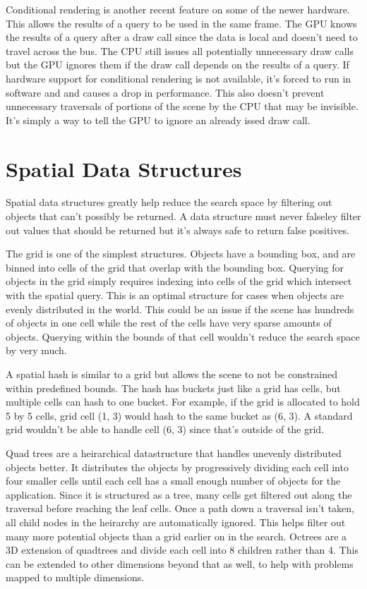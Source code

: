 \documentclass[12pt]{ucthesis}
\begin{document}
Conditional rendering is another recent feature on some of the newer hardware.
This allows the results of a query to be used in the same frame.
The GPU knows the results of a query after a draw call since the data is local and doesn't need to travel across the bus.
The CPU still issues all potentially unnecessary draw calls but the GPU ignores them if the draw call depends on the results of a query.
If hardware support for conditional rendering is not available, it's forced to run in software and and causes a drop in performance.
This also doesn't prevent unnecessary traversals of portions of the scene by the CPU that may be invisible.
It's simply a way to tell the GPU to ignore an already issed draw call.

\section{Spatial Data Structures}
\label{spatial-data-structures}

Spatial data structures greatly help reduce the search space by filtering out objects that can't possibly be returned.
A data structure must never falseley filter out values that should be returned but it's always safe to return false positives.

The grid is one of the simplest structures.
Objects have a bounding box, and are binned into cells of the grid that overlap with the bounding box.\cite{culling-bf, applications-spatial, chess}
Querying for objects in the grid simply requires indexing into cells of the grid which intersect with the spatial query.
This is an optimal structure for cases when objects are evenly distributed in the world.
This could be an issue if the scene has hundreds of objects in one cell while the rest of the cells have very sparse amounts of objects.
Querying within the bounds of that cell wouldn't reduce the search space by very much.

A spatial hash is similar to a grid but allows the scene to not be constrained within predefined bounds.
The hash has buckets just like a grid has cells, but multiple cells can hash to one bucket.
For example, if the grid is allocated to hold 5 by 5 cells, grid cell (1, 3) would hash to the same bucket as (6, 3).
A standard grid wouldn't be able to handle cell (6, 3) since that's outside of the grid.

Quad trees are a heirarchical datastructure that handles unevenly distributed objects better.\cite{applications-spatial}
It distributes the objects by progressively dividing each cell into four smaller cells until each cell has a small enough number of objects for the application.
Since it is structured as a tree, many cells get filtered out along the traversal before reaching the leaf cells.
Once a path down a traversal isn't taken, all child nodes in the heirarchy are automatically ignored.
This helps filter out many more potential objects than a grid earlier on in the search.
Octrees are a 3D extension of quadtrees and divide each cell into 8 children rather than 4.
This can be extended to other dimensions beyond that as well, to help with problems mapped to multiple dimensions.\cite{applications-spatial}
\end{document}
